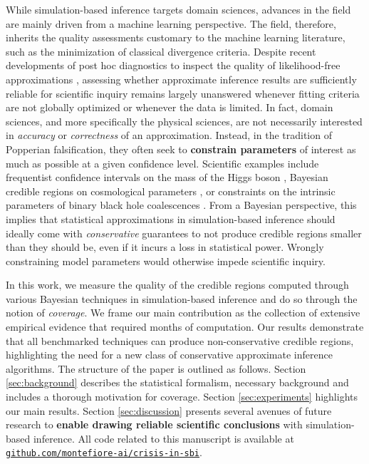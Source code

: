 \documentclass[twoside]{article}
\begin{document}
While simulation-based inference targets domain sciences, advances in the field are mainly driven from a machine learning perspective.
The field, therefore, inherits the quality assessments \citep{lueckmann2021benchmarking} customary to the machine learning literature, such as the minimization of classical divergence criteria.
Despite recent developments of post hoc diagnostics to inspect the quality of likelihood-free approximations \citep{cranmer2015approximating, Brehmer:2018eca, brehmer2019mining, Hermans:2020skz, lueckmann2021benchmarking, sbc, dalmasso2020confidence}, assessing whether approximate inference results are sufficiently reliable for scientific inquiry remains largely unanswered whenever fitting criteria are not globally optimized or whenever the data is limited.
In fact, domain sciences, and more specifically the physical sciences, are not necessarily interested in \emph{accuracy} or \emph{correctness} of an approximation.
Instead, in the tradition of Popperian falsification, they often seek to {\bfseries constrain parameters} of interest as much as possible at a given confidence level.
Scientific examples include frequentist confidence intervals on the mass of the Higgs boson \citep{aad2012observation}, Bayesian credible regions on cosmological parameters \citep{gilman2018probing,Planck:2018vyg}, or constraints on the intrinsic parameters of binary black hole coalescences \citep{abbott2016gw151226}.
From a Bayesian perspective, this implies that statistical approximations in simulation-based inference should ideally come with \emph{conservative} guarantees to not produce credible regions smaller than they should be, even if it incurs a loss in statistical power.
Wrongly constraining model parameters would otherwise impede scientific inquiry.

In this work, we measure the quality of the credible regions computed through various Bayesian techniques in simulation-based inference and do so through the notion of \emph{coverage}.
We frame our main contribution as the collection of extensive empirical evidence that required months of computation.
Our results demonstrate that all benchmarked techniques can produce non-conservative credible regions, highlighting the need for a new class of conservative approximate inference algorithms.
The structure of the paper is outlined as follows.
Section \ref{sec:background} describes the statistical formalism, necessary background and includes a thorough motivation for coverage.
Section \ref{sec:experiments} highlights our main results.
Section \ref{sec:discussion} presents several avenues of future research to {\bfseries enable drawing reliable scientific conclusions} with simulation-based inference. All code related to this manuscript is available at
\href{https://github.com/montefiore-ai/crisis-in-sbi}{\texttt{github.com/montefiore-ai/crisis-in-sbi}}.
\end{document}
